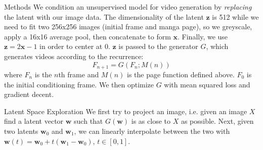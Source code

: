\documentclass{beamer}                             %
\begin{document}
\begin{frame}
\begin{columns}
\begin{column}{0.33\textwidth}
      \begin{block}{Methods}
        \setlength{\parindent}{1em}
        We condition an unsupervised model for video generation
        by \textit{replacing} the latent with our image data. The
        dimensionality of the latent \( \bm{z} \) is 512 while we need
        to fit two 256x256 images (initial frame and manga page), so we
        greyscale, apply a 16x16 average pool, then concatenate to form
        \( \bm{x} \). Finally, we use \( \bm{z} = 2 \bm{x} - 1 \) in
        order to center at 0. \( \bm{z} \) is passed to the generator
        \( G \), which generates videos according to the recurrence:
        \[ F_{n + 1} = G(F_n; M(n)) \]
        where \( F_n \) is the \( n \)th frame and \( M(n) \) is the page
        function defined above. \( F_0 \) is the initial conditioning frame.
        We then optimize \( G \) with mean squared loss and gradient decent.
      \end{block}
 
      \begin{block}{Latent Space Exploration}
      \setlength{\parindent}{1em}
        We first try to project an image, i.e. given an image \( X \) find
        a latent vector \( \bm{w} \) such that \( G(\bm{w}) \) is as close
        to \( X \) as possible. Next, given two latents \( \bm{w}_0 \) and
        \( \bm{w}_1 \), we can linearly interpolate between the two with \(
        \bm{w}(t) = \bm{w}_0 + t (\bm{w}_1 - \bm{w}_0) \), \( t \in [0, 1] \).
      \end{block}


\end{column}
\end{columns}
\end{frame}
\end{document}

